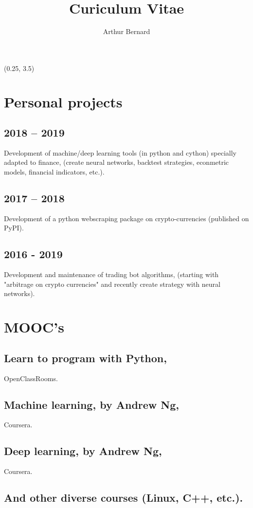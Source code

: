 \documentclass[a4paper,11pt]{arthur-cv}
\title{Curiculum Vitae}
\author{Arthur Bernard}
\begin{document}
\makeprofile %

\begin{textblock}{20.5}(0.25, 3.5)

  \begin{minipage}[t]{0.38\textwidth}
  
    \section{Personal projects}
      \subsection{2018 – 2019}{Development of  machine/deep learning  tools (in python and cython) specially adapted to finance, (create neural networks, backtest strategies, econmetric models, financial indicators, etc.).}
      \subsection{2017 – 2018}{Development of a python webscraping package on crypto-currencies (published on PyPI).}
      \subsection{2016 - 2019}{Development and maintenance of trading bot algorithms, (starting with "arbitrage on crypto currencies" and recently create strategy with neural networks).}

    \section{MOOC's}
      \subsection{Learn to program with Python,}{OpenClassRooms.}
      \subsection{Machine learning, by Andrew Ng,}{Coursera.}
      \subsection{Deep learning, by Andrew Ng,}{Coursera.}
      \subsection{And other diverse courses (Linux, C++, etc.).}


\end{minipage}
\end{textblock}
\end{document}
